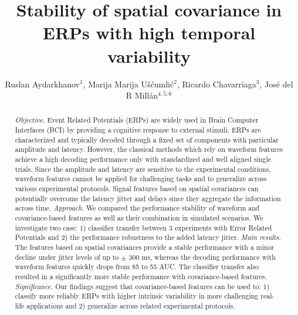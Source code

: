 \documentclass[12pt]{iopart}
\begin{document}
\title[]{Stability of spatial covariance in ERPs with high temporal variability}

\author{Ruslan Aydarkhanov$^1$,
Marija Marija U\v{s}\'{c}umli\'{c}$^2$,
Ricardo Chavarriaga$^3$,
Jos\'e del R Mill\'an$^{4,5,6}$}


\address{$^1$Medical Image Processing Laboratory,
Center for Neuroprosthetics,
Interschool Institute of Bioengineering,
\'Ecole Polytechnique F\'ed\'erale de Lausanne (EPFL),
Campus Biotech H4,
1202 Geneva,
Switzerland}
\address{$^2$Nissan International SA,
La Pi\`ece 12,
1180 Rolle,
Switzerland
}
\address{$^3$Zurich University of Applied Sciences, ZHAW,
InIT Institut of Applied Information Technology,
Ob. Kirchgasse 2,
8400 Winterthur,
Switzerland}
\address{$^4$Dept. of Electrical and Computer Engineering,
The University of Texas at Austin,
Austin, TX 78712,
USA}
\address{$^5$Dept. of Neurology,
The University of Texas at Austin,
Austin, TX 78712,
USA}
\address{$^6$\'Ecole Polytechnique F\'ed\'erale de Lausanne (EPFL),
Campus Biotech H4,
1202 Geneva,
 Switzerland}
\vspace{10pt}

\begin{abstract}
\textit{Objective.} Event Related Potentials (ERPs) are widely used in Brain Computer
Interfaces (BCI) by providing a cognitive response to external stimuli.
ERPs are characterized and typically decoded through a fixed set of
components with particular amplitude and latency. 
However, the classical methods which rely on waveform features
achieve a high decoding performance only with standardized
and well aligned single trials. Since the amplitude and latency
are sensitive to the experimental conditions,
waveform features cannot be applied for challenging tasks and
to generalize across various experimental protocols.
Signal features based on spatial covariances can potentially overcome
the latency jitter and delays since they aggregate the information
across time.
\textit{Approach.} We compared the performance stability 
of waveform and covariance-based features as well as their combination
in simulated scenarios. We investigate two case: 1) classifier transfer 
between 3 experiments with Error Related Potentials
and 2) the performance robustness to the added latency jitter.
\textit{Main results.} The features based on spatial covariances
provide a stable performance with a minor decline
under jitter levels of up to $\pm$ 300 ms,
whereas the decoding performance with waveform features
quickly drops from 85 to 55 AUC. The classifier transfer also
resulted in a significantly more stable performance with covariance-based
features.
\textit{Significance.} Our findings suggest that covariance-based features
can be used to: 1) classify more reliably ERPs
with higher intrinsic variability in more challenging real-life applications
and 2) generalize across related experimental protocols.
\end{abstract}
\end{document}
